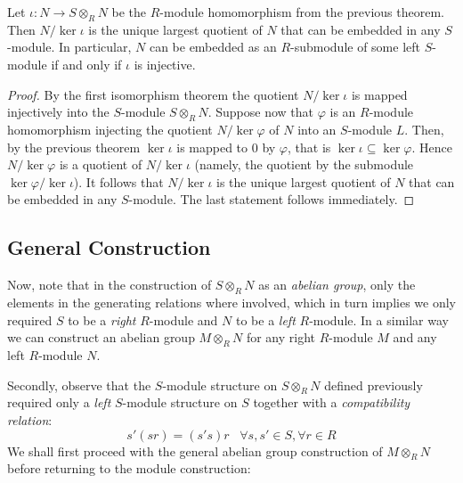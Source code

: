 \documentclass[12pt, a4paper, oneside, openright, titlepage]{book}
\begin{document}
\begin{cor}
    Let $\iota:N\rightarrow S\otimes_RN$ be the $R$-module homomorphism from the previous theorem. Then $N/\ker \iota$ is the unique largest quotient of $N$ that can be embedded in any $S$-module. In particular, $N$ can be embedded as an $R$-submodule of some left $S$-module if and only if $\iota$ is injective.
\end{cor}
\begin{proof}
    By the first isomorphism theorem the quotient $N/\ker \iota$ is mapped injectively into the $S$-module $S\otimes_RN$. Suppose now that $\varphi$ is an $R$-module homomorphism injecting the quotient $N/\ker\varphi$ of $N$ into an $S$-module $L$. Then, by the previous theorem $\ker\iota$ is mapped to $0$ by $\varphi$, that is $\ker\iota \subseteq \ker\varphi$. Hence $N/\ker\varphi$ is a quotient of $N/\ker\iota$ (namely, the quotient by the submodule $\ker\varphi/\ker\iota$). It follows that $N/\ker\iota$ is the unique largest quotient of $N$ that can be embedded in any $S$-module. The last statement follows immediately.
\end{proof}

\subsection{General Construction}

Now, note that in the construction of $S\otimes_RN$ as an \emph{abelian group}, only the elements in the generating relations where involved, which in turn implies we only required $S$ to be a \emph{right} $R$-module and $N$ to be a \emph{left} $R$-module. In a similar way we can construct an abelian group $M\otimes_RN$ for any right $R$-module $M$ and any left $R$-module $N$.

Secondly, observe that the $S$-module structure on $S\otimes_RN$ defined previously required only a \emph{left} $S$-module structure on $S$ together with a \emph{compatibility relation}: \begin{equation*}
    s'(sr)=(s's)r\;\;\;\forall s,s' \in S,\forall r \in R
\end{equation*}
We shall first proceed with the general abelian group construction of $M\otimes_RN$ before returning to the module construction:
\end{document}
